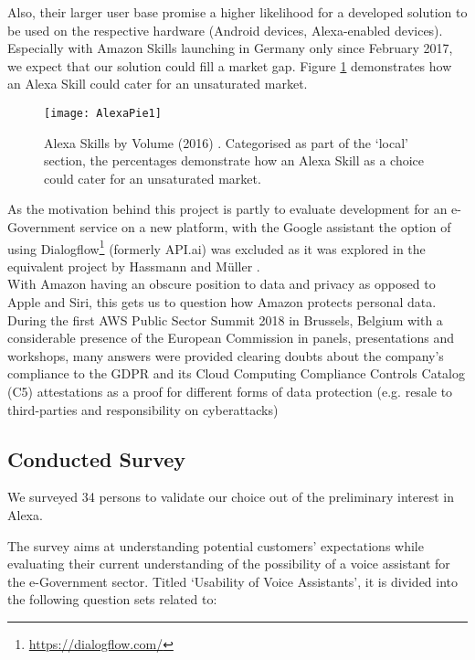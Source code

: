 Also, their larger user base promise a higher likelihood for a developed solution to be used on the respective hardware (Android devices, Alexa-enabled devices).
Especially with Amazon Skills launching in Germany only since February 2017, we expect that our solution could fill a market gap. Figure \ref{skillsbyvol} demonstrates how an Alexa Skill could cater for an unsaturated market.




\begin{figure}[h]
	\caption[Alexa Skills by Volume (2016)]{Alexa Skills by Volume (2016) \cite{voicelabs:trends}. Categorised as part of the `local' section, the percentages demonstrate how an Alexa Skill as a choice could cater for an unsaturated market.}
	\label{skillsbyvol}
	\texttt{[image: AlexaPie1]} 
\end{figure}


As the motivation behind this project is partly to evaluate development for an e-Government service on a new platform, with the Google assistant the option of using Dialogflow\footnote{\url{https://dialogflow.com/}} (formerly API.ai) was excluded as it was explored in the equivalent project by Hassmann and Müller \cite{hassmannMlr:berlina}.\\



With Amazon having an obscure position to data and privacy as opposed to Apple and Siri, this gets us to question how Amazon protects personal data. During the first AWS Public Sector Summit 2018 in Brussels, Belgium with a considerable presence of the European Commission in panels, presentations and workshops, many answers were provided clearing doubts about the company's compliance to the GDPR and its Cloud Computing Compliance Controls Catalog (C5) attestations as a proof %
for different forms of data protection (e.g. resale to
 third-parties and responsibility on cyberattacks) \cite{aws:pubsecsum}
\subsection*{Conducted Survey}

We surveyed 34 persons to validate our choice out of the preliminary interest in Alexa. 


The survey aims at understanding potential customers' expectations while evaluating their current understanding of the possibility of a voice assistant for the e-Government sector. Titled `Usability of Voice Assistants', it is divided into the following question sets related to:

